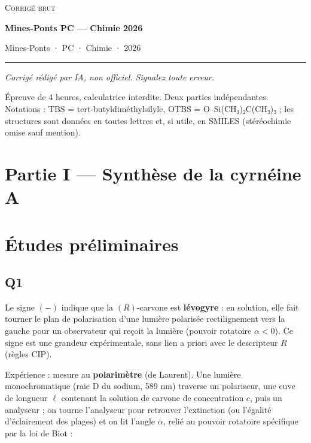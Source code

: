 \documentclass[11pt,a4paper]{article}
\begin{document}
\thispagestyle{plain}
\begin{center}
  {\small\scshape Corrigé brut}\par\smallskip
  {\LARGE\bfseries Mines-Ponts PC — Chimie 2026\par}\medskip
  {\large Mines-Ponts · PC · Chimie · 2026\par}
\end{center}
\vspace{2pt}\hrule\vspace{8pt}

\emph{Corrigé rédigé par IA, non officiel. Signalez toute erreur.}

Épreuve de 4 heures, calculatrice interdite. Deux parties indépendantes. Notations : TBS = tert-\allowbreak{}butyldiméthylsilyle, OTBS = O--Si(CH₃)₂C(CH₃)₃ ; les structures sont données en toutes lettres et, si utile, en SMILES (stéréochimie omise sauf mention).

\hypertarget{partie-i-synthuxe8se-de-la-cyrnuxe9ine-a}{%
\section{Partie I --- Synthèse de la cyrnéine A}\label{partie-i-synthuxe8se-de-la-cyrnuxe9ine-a}}

\hypertarget{uxe9tudes-pruxe9liminaires}{%
\section{Études préliminaires}\label{uxe9tudes-pruxe9liminaires}}

\hypertarget{q1}{%
\subsection{Q1}\label{q1}}

Le signe \((-)\) indique que la \((R)\)-carvone est \textbf{lévogyre} : en solution, elle fait tourner le plan de polarisation d'une lumière polarisée rectilignement vers la gauche pour un observateur qui reçoit la lumière (pouvoir rotatoire \(\alpha<0\)). Ce signe est une grandeur expérimentale, sans lien a priori avec le descripteur \(R\) (règles CIP).

Expérience : mesure au \textbf{polarimètre} (de Laurent). Une lumière monochromatique (raie D du sodium, 589 nm) traverse un polariseur, une cuve de longueur \(\ell\) contenant la solution de carvone de concentration \(c\), puis un analyseur ; on tourne l'analyseur pour retrouver l'extinction (ou l'égalité d'éclairement des plages) et on lit l'angle \(\alpha\), relié au pouvoir rotatoire spécifique par la loi de Biot :
\end{document}
